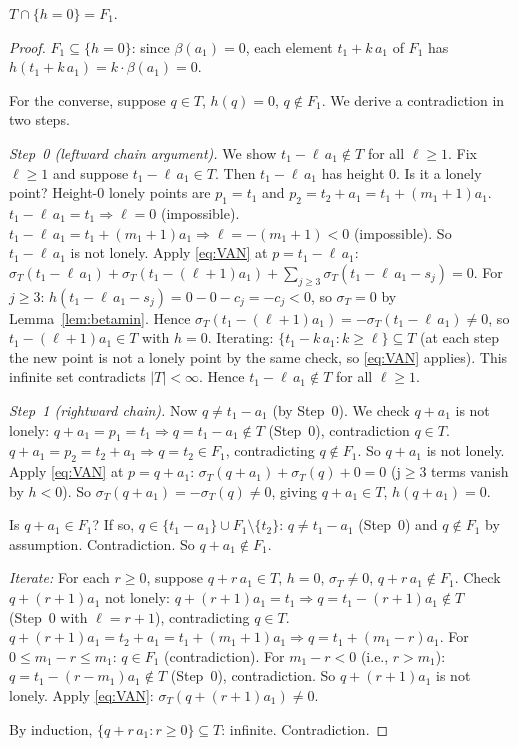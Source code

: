 \begin{lemma}[hzero]\label{lem:hzero}
$T\cap\{h=0\}=F_1$.
\end{lemma}
\begin{proof}
$F_1\subseteq\{h=0\}$: since $\beta(a_1)=0$, each element $t_1+k\,a_1$ of $F_1$
has $h(t_1+k\,a_1)=k\cdot\beta(a_1)=0$.

For the converse, suppose $q\in T$, $h(q)=0$, $q\notin F_1$.
We derive a contradiction in two steps.

\emph{Step~0 (leftward chain argument).}
We show $t_1-\ell\,a_1\notin T$ for all $\ell\ge 1$.
Fix $\ell\ge 1$ and suppose $t_1-\ell\,a_1\in T$.
Then $t_1-\ell\,a_1$ has height $0$.  Is it a lonely point?
Height-$0$ lonely points are $p_1=t_1$ and $p_2=t_2+a_1=t_1+(m_1+1)a_1$.
$t_1-\ell\,a_1=t_1\Rightarrow\ell=0$ (impossible).
$t_1-\ell\,a_1=t_1+(m_1+1)a_1\Rightarrow\ell=-(m_1+1)<0$ (impossible).
So $t_1-\ell\,a_1$ is not lonely.
Apply \eqref{eq:VAN} at $p=t_1-\ell\,a_1$:
$\sigma_T(t_1-\ell\,a_1)+\sigma_T(t_1-(\ell+1)a_1)+\sum_{j\ge3}\sigma_T(t_1-\ell\,a_1-s_j)=0$.
For $j\ge 3$: $h(t_1-\ell\,a_1-s_j)=0-0-c_j=-c_j<0$,
so $\sigma_T=0$ by Lemma~\ref{lem:betamin}.
Hence $\sigma_T(t_1-(\ell+1)a_1)=-\sigma_T(t_1-\ell\,a_1)\ne 0$,
so $t_1-(\ell+1)a_1\in T$ with $h=0$.
Iterating: $\{t_1-k\,a_1:k\ge\ell\}\subseteq T$ (at each step the new point
is not a lonely point by the same check, so \eqref{eq:VAN} applies).
This infinite set contradicts $|T|<\infty$.
Hence $t_1-\ell\,a_1\notin T$ for all $\ell\ge 1$.

\emph{Step~1 (rightward chain).}
Now $q\ne t_1-a_1$ (by Step~0).  We check $q+a_1$ is not lonely:
$q+a_1=p_1=t_1\Rightarrow q=t_1-a_1\notin T$ (Step~0), contradiction $q\in T$.
$q+a_1=p_2=t_2+a_1\Rightarrow q=t_2\in F_1$, contradicting $q\notin F_1$.
So $q+a_1$ is not lonely.  Apply \eqref{eq:VAN} at $p=q+a_1$:
$\sigma_T(q+a_1)+\sigma_T(q)+0=0$ (j$\ge3$ terms vanish by $h<0$).
So $\sigma_T(q+a_1)=-\sigma_T(q)\ne 0$, giving $q+a_1\in T$, $h(q+a_1)=0$.

Is $q+a_1\in F_1$?  If so, $q\in\{t_1-a_1\}\cup F_1\setminus\{t_2\}$:
$q\ne t_1-a_1$ (Step~0) and $q\notin F_1$ by assumption.  Contradiction.
So $q+a_1\notin F_1$.

\emph{Iterate:} For each $r\ge 0$, suppose $q+r\,a_1\in T$, $h=0$, $\sigma_T\ne 0$,
$q+r\,a_1\notin F_1$.  Check $q+(r+1)a_1$ not lonely:
$q+(r+1)a_1=t_1\Rightarrow q=t_1-(r+1)a_1\notin T$ (Step~0 with $\ell=r+1$),
contradicting $q\in T$.
$q+(r+1)a_1=t_2+a_1=t_1+(m_1+1)a_1\Rightarrow q=t_1+(m_1-r)a_1$.
For $0\le m_1-r\le m_1$: $q\in F_1$ (contradiction).
For $m_1-r<0$ (i.e., $r>m_1$): $q=t_1-(r-m_1)a_1\notin T$ (Step~0),
contradiction.
So $q+(r+1)a_1$ is not lonely.  Apply \eqref{eq:VAN}: $\sigma_T(q+(r+1)a_1)\ne 0$.

By induction, $\{q+r\,a_1:r\ge 0\}\subseteq T$: infinite.  Contradiction.
\end{proof}


